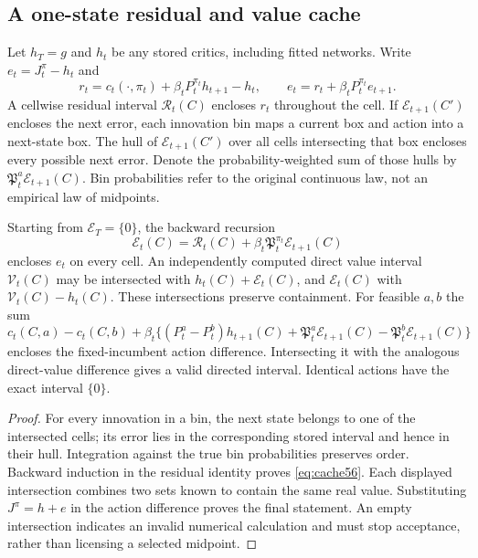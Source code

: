 \subsection{A one-state residual and value cache}
Let $h_T=g$ and $h_t$ be any stored critics, including fitted networks. Write $e_t=J_t^\pi-h_t$ and
\[
 r_t=c_t(\cdot,\pi_t)+\beta_tP_t^{\pi_t}h_{t+1}-h_t,
 \qquad e_t=r_t+\beta_tP_t^{\pi_t}e_{t+1}.
\]
A cellwise residual interval $\mathcal R_t(C)$ encloses $r_t$ throughout the cell. If $\mathcal E_{t+1}(C')$ encloses the next error, each innovation bin maps a current box and action into a next-state box. The hull of $\mathcal E_{t+1}(C')$ over all cells intersecting that box encloses every possible next error. Denote the probability-weighted sum of those hulls by $\mathfrak P_t^a\mathcal E_{t+1}(C)$. Bin probabilities refer to the original continuous law, not an empirical law of midpoints.

\begin{proposition}\label{prop:cache56}
Starting from $\mathcal E_T=\{0\}$, the backward recursion
\begin{equation}\label{eq:cache56}
 \mathcal E_t(C)=\mathcal R_t(C)+\beta_t
                       \mathfrak P_t^{\pi_t}\mathcal E_{t+1}(C)
\end{equation}
encloses $e_t$ on every cell. An independently computed direct value interval $\mathcal V_t(C)$ may be intersected with $h_t(C)+\mathcal E_t(C)$, and $\mathcal E_t(C)$ with $\mathcal V_t(C)-h_t(C)$. These intersections preserve containment. For feasible $a,b$ the sum
\[
 c_t(C,a)-c_t(C,b)+\beta_t\{(P_t^a-P_t^b)h_{t+1}(C)
       +\mathfrak P_t^a\mathcal E_{t+1}(C)
       -\mathfrak P_t^b\mathcal E_{t+1}(C)\}
\]
encloses the fixed-incumbent action difference. Intersecting it with the analogous direct-value difference gives a valid directed interval. Identical actions have the exact interval $\{0\}$.
\end{proposition}
\begin{proof}
For every innovation in a bin, the next state belongs to one of the intersected cells; its error lies in the corresponding stored interval and hence in their hull. Integration against the true bin probabilities preserves order. Backward induction in the residual identity proves \eqref{eq:cache56}. Each displayed intersection combines two sets known to contain the same real value. Substituting $J^\pi=h+e$ in the action difference proves the final statement. An empty intersection indicates an invalid numerical calculation and must stop acceptance, rather than licensing a selected midpoint.
\end{proof}


